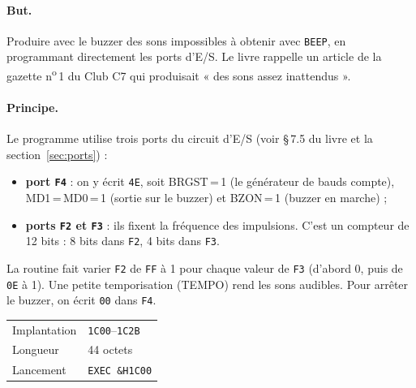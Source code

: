 \documentclass[a4paper,10pt]{article}
\makeatletter
\newcommand{\hex}[1]{\texttt{#1}}
\newcommand{\fiche}[3]{%
  \begin{center}\small
  \begin{tabular}{@{}ll@{}}
  \toprule
  Implantation & #1 \\
  Longueur & #2 \\
  Lancement & #3 \\
  \bottomrule
  \end{tabular}
  \end{center}}
\makeatother
\begin{document}
\paragraph{But.} Produire avec le buzzer des sons impossibles à obtenir
avec \texttt{BEEP}, en programmant directement les ports d'E/S. Le livre
rappelle un article de la gazette n\textsuperscript{o}\,1 du Club C7 qui
produisait « des sons assez inattendus ».

\paragraph{Principe.} Le programme utilise trois ports du circuit d'E/S
(voir §\,7.5 du livre et la section~\ref{sec:ports}) :
\begin{itemize}
  \item \textbf{port \hex{F4}} : on y écrit \hex{4E}, soit BRGST\,=\,1
        (le générateur de bauds compte), MD1\,=\,MD0\,=\,1 (sortie sur le
        buzzer) et BZON\,=\,1 (buzzer en marche) ;
  \item \textbf{ports \hex{F2} et \hex{F3}} : ils fixent la fréquence des
        impulsions. C'est un compteur de 12 bits : 8 bits dans \hex{F2},
        4 bits dans \hex{F3}.
\end{itemize}
La routine fait varier \hex{F2} de \hex{FF} à 1 pour chaque valeur de
\hex{F3} (d'abord 0, puis de \hex{0E} à 1). Une petite temporisation (TEMPO)
rend les sons audibles. Pour arrêter le buzzer, on écrit \hex{00} dans
\hex{F4}.

\fiche{\hex{1C00}--\hex{1C2B}}{44 octets}{\texttt{EXEC \&H1C00}}
\end{document}
